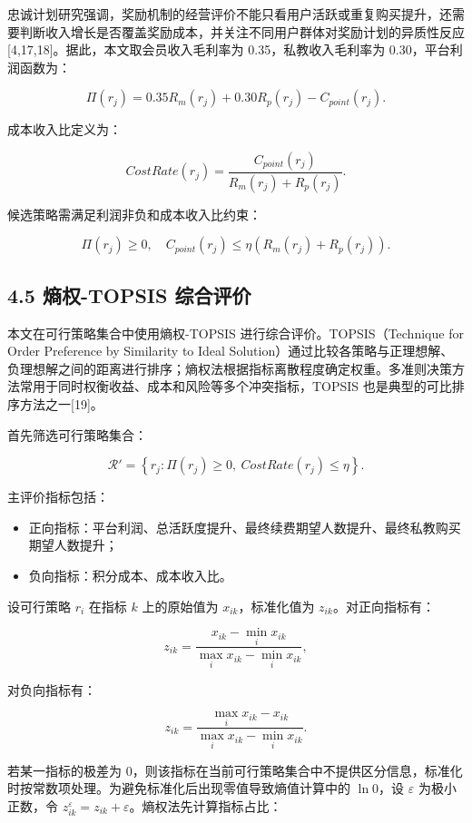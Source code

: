 \documentclass[
  12pt,
]{ctexart}
\providecommand{\tightlist}{%
  \setlength{\itemsep}{0pt}\setlength{\parskip}{0pt}}
\begin{document}
忠诚计划研究强调，奖励机制的经营评价不能只看用户活跃或重复购买提升，还需要判断收入增长是否覆盖奖励成本，并关注不同用户群体对奖励计划的异质性反应{[}4,17,18{]}。据此，本文取会员收入毛利率为 0.35，私教收入毛利率为 0.30，平台利润函数为：

\[
\Pi(r_j)=0.35R_m(r_j)+0.30R_p(r_j)-C_{point}(r_j).
\tag{34}
\]

成本收入比定义为：

\[
CostRate(r_j)=\frac{C_{point}(r_j)}{R_m(r_j)+R_p(r_j)}.
\tag{35}
\]

候选策略需满足利润非负和成本收入比约束：

\[
\Pi(r_j)\geq0,\quad C_{point}(r_j)\leq\eta(R_m(r_j)+R_p(r_j)).
\tag{36}
\]

\hypertarget{ux71b5ux6743-topsis-ux7efcux5408ux8bc4ux4ef7}{%
\subsection{4.5 熵权-TOPSIS 综合评价}\label{ux71b5ux6743-topsis-ux7efcux5408ux8bc4ux4ef7}}

本文在可行策略集合中使用熵权-TOPSIS 进行综合评价。TOPSIS（Technique for Order Preference by Similarity to Ideal Solution）通过比较各策略与正理想解、负理想解之间的距离进行排序；熵权法根据指标离散程度确定权重。多准则决策方法常用于同时权衡收益、成本和风险等多个冲突指标，TOPSIS 也是典型的可比排序方法之一{[}19{]}。

首先筛选可行策略集合：

\[
\mathcal{R}'=\left\{r_j:\Pi(r_j)\geq0,\ CostRate(r_j)\leq\eta\right\}.
\tag{37}
\]

主评价指标包括：

\begin{itemize}
\tightlist
\item
  正向指标：平台利润、总活跃度提升、最终续费期望人数提升、最终私教购买期望人数提升；
\item
  负向指标：积分成本、成本收入比。
\end{itemize}

设可行策略 \(r_i\) 在指标 \(k\) 上的原始值为 \(x_{ik}\)，标准化值为 \(z_{ik}\)。对正向指标有：

\[
z_{ik}=\frac{x_{ik}-\min_i x_{ik}}{\max_i x_{ik}-\min_i x_{ik}},
\tag{38}
\]

对负向指标有：

\[
z_{ik}=\frac{\max_i x_{ik}-x_{ik}}{\max_i x_{ik}-\min_i x_{ik}}.
\tag{39}
\]

若某一指标的极差为 0，则该指标在当前可行策略集合中不提供区分信息，标准化时按常数项处理。为避免标准化后出现零值导致熵值计算中的 \(\ln 0\)，设 \(\varepsilon\) 为极小正数，令 \(z_{ik}^{\varepsilon}=z_{ik}+\varepsilon\)。熵权法先计算指标占比：
\end{document}
